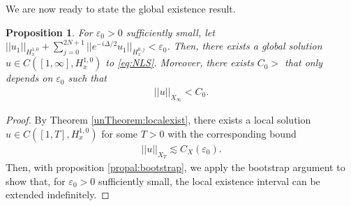 \documentclass[a4paper, 15pt]{article}
\numberwithin{equation}{section}
\newtheorem{propal}[defi]{Proposition}
\begin{document}
We are now ready to state the global existence result.
\begin{propal}
\label{propal:GWP}
For $\varepsilon_0>0$ sufficiently small, let $||u_1||_{H^{1,0}_x}+\sum^{2N+1}_{j=0}||e^{-i\Delta/2}u_1||_{H^{0,j}_x}<\varepsilon_0$. Then, there exists a global solution $u\in C([1,\infty],H^{1,0}_x)$ to \eqref{eq:NLS}. Moreover, there exists $C_0>$ that only depends on $\varepsilon_0$ such that
\begin{align}
\label{eq:GWPeq}
||u||_{X_\infty}<C_0.
\end{align}
\end{propal}
\begin{proof}
By Theorem \ref{unTheorem:localexist}, there exists a local solution $u\in C([1,T],H^{1,0}_x)$ for some $T>0$ with the corresponding bound 
\begin{align}
||u||_{X_T}\lesssim C_X(\varepsilon_0).
\end{align}
Then, with proposition \ref{propal:bootstrap}, we apply the bootstrap argument to show that, for $\varepsilon_0>0$ sufficiently small, the local existence interval can be extended indefinitely. 
\end{proof}
\end{document}
